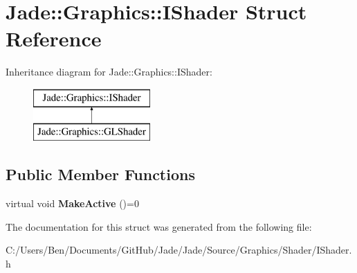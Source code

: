 \hypertarget{struct_jade_1_1_graphics_1_1_i_shader}{}\section{Jade\+:\+:Graphics\+:\+:I\+Shader Struct Reference}
\label{struct_jade_1_1_graphics_1_1_i_shader}
Inheritance diagram for Jade\+:\+:Graphics\+:\+:I\+Shader\+:\begin{figure}[H]
\begin{center}
\leavevmode
\includegraphics[height=2.000000cm]{struct_jade_1_1_graphics_1_1_i_shader}
\end{center}
\end{figure}
\subsection*{Public Member Functions}
\begin{DoxyCompactItemize}
\item 
\hypertarget{struct_jade_1_1_graphics_1_1_i_shader_a0c7e4a24b2618363efb6eb11442f7589}{}virtual void {\bfseries Make\+Active} ()=0\label{struct_jade_1_1_graphics_1_1_i_shader_a0c7e4a24b2618363efb6eb11442f7589}

\end{DoxyCompactItemize}


The documentation for this struct was generated from the following file\+:\begin{DoxyCompactItemize}
\item 
C\+:/\+Users/\+Ben/\+Documents/\+Git\+Hub/\+Jade/\+Jade/\+Source/\+Graphics/\+Shader/I\+Shader.\+h\end{DoxyCompactItemize}
